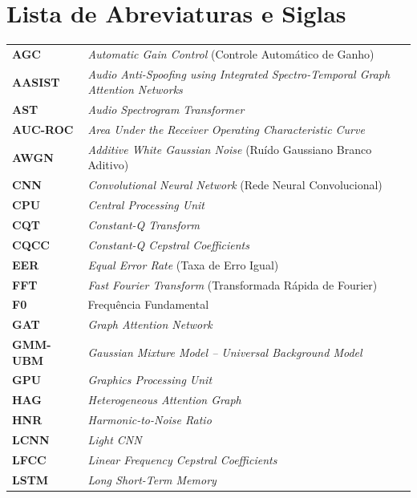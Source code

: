 \documentclass[12pt,a4paper]{article}
\begin{document}
\section*{Lista de Abreviaturas e Siglas}

\begin{singlespace}
\begin{tabular}{p{2.5cm}p{12cm}}
\textbf{AGC}      & \textit{Automatic Gain Control} (Controle Automático de Ganho) \\
\textbf{AASIST}   & \textit{Audio Anti-Spoofing using Integrated Spectro-Temporal Graph Attention Networks} \\
\textbf{AST}      & \textit{Audio Spectrogram Transformer} \\
\textbf{AUC-ROC}  & \textit{Area Under the Receiver Operating Characteristic Curve} \\
\textbf{AWGN}     & \textit{Additive White Gaussian Noise} (Ruído Gaussiano Branco Aditivo) \\
\textbf{CNN}      & \textit{Convolutional Neural Network} (Rede Neural Convolucional) \\
\textbf{CPU}      & \textit{Central Processing Unit} \\
\textbf{CQT}      & \textit{Constant-Q Transform} \\
\textbf{CQCC}     & \textit{Constant-Q Cepstral Coefficients} \\
\textbf{EER}      & \textit{Equal Error Rate} (Taxa de Erro Igual) \\
\textbf{FFT}      & \textit{Fast Fourier Transform} (Transformada Rápida de Fourier) \\
\textbf{F0}       & Frequência Fundamental \\
\textbf{GAT}      & \textit{Graph Attention Network} \\
\textbf{GMM-UBM}  & \textit{Gaussian Mixture Model -- Universal Background Model} \\
\textbf{GPU}      & \textit{Graphics Processing Unit} \\
\textbf{HAG}      & \textit{Heterogeneous Attention Graph} \\
\textbf{HNR}      & \textit{Harmonic-to-Noise Ratio} \\
\textbf{LCNN}     & \textit{Light CNN} \\
\textbf{LFCC}     & \textit{Linear Frequency Cepstral Coefficients} \\
\textbf{LSTM}     & \textit{Long Short-Term Memory} \\

\end{tabular}
\end{singlespace}
\end{document}
